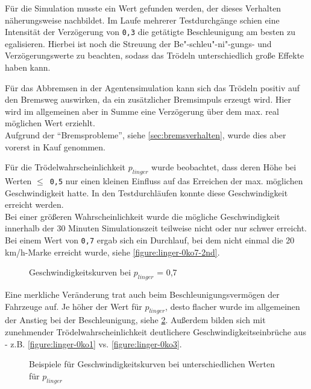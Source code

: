 Für die Simulation musste ein Wert gefunden werden, der dieses Verhalten näherungsweise nachbildet.
Im Laufe mehrerer Testdurchgänge schien eine Intensität der Verzögerung von \texttt{0,3} die getätigte Beschleunigung am besten zu egalisieren. 
Hierbei ist noch die Streuung der Be"-schleu"-ni"-gungs- und Verzögerungswerte zu beachten, sodass das Trödeln unterschiedlich große Effekte haben kann.

Für das Abbremsen in der Agentensimulation kann sich das Trödeln positiv auf den Bremsweg auswirken, da ein zusätzlicher Bremsimpuls erzeugt wird. 
Hier wird im allgemeinen aber in Summe eine Verzögerung über dem max. real möglichen Wert erziehlt.
\\
Aufgrund der \enquote{Bremsprobleme}, siehe \cref{sec:bremsverhalten}, wurde dies aber vorerst in Kauf genommen.

Für die Trödelwahrscheinlichkeit $ p_{linger} $ wurde beobachtet, dass deren Höhe bei Werten \mbox{$\leq$ \texttt{0,5}} nur einen kleinen Einfluss auf das Erreichen der max. möglichen Geschwindigkeit hatte.
In den Testdurchläufen konnte diese Geschwindigkeit erreicht werden.
\\
Bei einer größeren Wahrscheinlichkeit wurde die mögliche Geschwindigkeit innerhalb der 30 Minuten Simulationszeit teilweise nicht oder nur schwer erreicht.
Bei einem Wert von \texttt{0,7} ergab sich ein Durchlauf, bei dem nicht einmal die 20 km/h-Marke erreicht wurde, siehe \cref{figure:linger-0ko7-2nd}.

\begin{figure}[hptb]
  \centering 
   \qquad
   \qquad
  \caption{Geschwindigkeitskurven bei $p_{linger}$ = 0,7}
  \label{figure:linger-0ko7}
\end{figure}

Eine merkliche Veränderung trat auch beim Beschleunigungsvermögen der Fahrzeuge auf.
Je höher der Wert für $ p_{linger} $, desto flacher wurde im allgemeinen der Anstieg bei der Beschleunigung, siehe \cref{figure:linger-0ko1-3-5}.
Außerdem bilden sich mit zunehmender Trödelwahrscheinlichkeit deutlichere Geschwindigkeitseinbrüche aus - z.B. \cref{figure:linger-0ko1} vs. \cref{figure:linger-0ko3}.

\begin{figure}[hptb]
  \centering 
   \qquad
   \qquad
  \caption{Beispiele für Geschwindigkeitskurven bei unterschiedlichen Werten für $p_{linger}$}
  \label{figure:linger-0ko1-3-5}
\end{figure}

